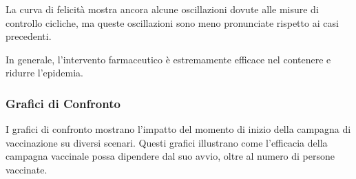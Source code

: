 La curva di felicità mostra ancora alcune oscillazioni dovute alle 
misure di controllo cicliche, ma queste oscillazioni sono meno 
pronunciate rispetto ai casi precedenti.

In generale, l'intervento farmaceutico è estremamente efficace nel 
contenere e ridurre l'epidemia.

\subsubsection{Grafici di Confronto}

I grafici di confronto mostrano l'impatto del momento di inizio della 
campagna di vaccinazione su diversi scenari. Questi grafici illustrano 
come l'efficacia della campagna vaccinale possa dipendere dal suo avvio, 
oltre al numero di persone vaccinate.

